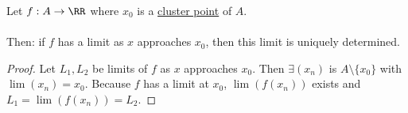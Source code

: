 \documentclass[class=scrartcl, crop=false]{standalone}
\begin{document}
\begin{theorem}
  Let $f: A \to \RR$ where $x_0$ is a \ul{cluster point} of $A$.
  \\\\
  Then: if $f$ has a limit as $x$ approaches $x_0$, then this limit is uniquely determined.
  \begin{proof}
    Let $L_1, L_2$ be limits of $f$ as $x$ approaches $x_0$. Then $\exists (x_n)$ is $A \setminus \{x_0\}$ with $\lim(x_n) = x_0$. Because $f$ has a limit at $x_0$, $\lim(f(x_n))$ exists and $L_1 = \lim(f(x_n)) = L_2$.
  \end{proof} 
\end{theorem} 
\end{document}
